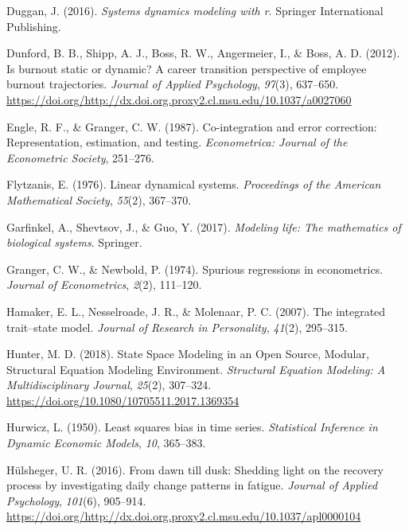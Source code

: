 \documentclass[english,,man]{apa6}
\begin{document}
\leavevmode\hypertarget{ref-duggan_systems}{}%
Duggan, J. (2016). \emph{Systems dynamics modeling with r}. Springer International Publishing.

\leavevmode\hypertarget{ref-dunford_is_2012}{}%
Dunford, B. B., Shipp, A. J., Boss, R. W., Angermeier, I., \& Boss, A. D. (2012). Is burnout static or dynamic? A career transition perspective of employee burnout trajectories. \emph{Journal of Applied Psychology}, \emph{97}(3), 637--650. \url{https://doi.org/http://dx.doi.org.proxy2.cl.msu.edu/10.1037/a0027060}

\leavevmode\hypertarget{ref-engle_co-integration_1987}{}%
Engle, R. F., \& Granger, C. W. (1987). Co-integration and error correction: Representation, estimation, and testing. \emph{Econometrica: Journal of the Econometric Society}, 251--276.

\leavevmode\hypertarget{ref-flytzanis1976linear}{}%
Flytzanis, E. (1976). Linear dynamical systems. \emph{Proceedings of the American Mathematical Society}, \emph{55}(2), 367--370.

\leavevmode\hypertarget{ref-garfinkel2017modeling}{}%
Garfinkel, A., Shevtsov, J., \& Guo, Y. (2017). \emph{Modeling life: The mathematics of biological systems}. Springer.

\leavevmode\hypertarget{ref-granger_spurious_1974}{}%
Granger, C. W., \& Newbold, P. (1974). Spurious regressions in econometrics. \emph{Journal of Econometrics}, \emph{2}(2), 111--120.

\leavevmode\hypertarget{ref-hamaker2007integrated}{}%
Hamaker, E. L., Nesselroade, J. R., \& Molenaar, P. C. (2007). The integrated trait--state model. \emph{Journal of Research in Personality}, \emph{41}(2), 295--315.

\leavevmode\hypertarget{ref-hunter_state_2018}{}%
Hunter, M. D. (2018). State Space Modeling in an Open Source, Modular, Structural Equation Modeling Environment. \emph{Structural Equation Modeling: A Multidisciplinary Journal}, \emph{25}(2), 307--324. \url{https://doi.org/10.1080/10705511.2017.1369354}

\leavevmode\hypertarget{ref-hurwicz1950least}{}%
Hurwicz, L. (1950). Least squares bias in time series. \emph{Statistical Inference in Dynamic Economic Models}, \emph{10}, 365--383.

\leavevmode\hypertarget{ref-hulsheger_dawn_2016}{}%
Hülsheger, U. R. (2016). From dawn till dusk: Shedding light on the recovery process by investigating daily change patterns in fatigue. \emph{Journal of Applied Psychology}, \emph{101}(6), 905--914. \url{https://doi.org/http://dx.doi.org.proxy2.cl.msu.edu/10.1037/apl0000104}
\end{document}
